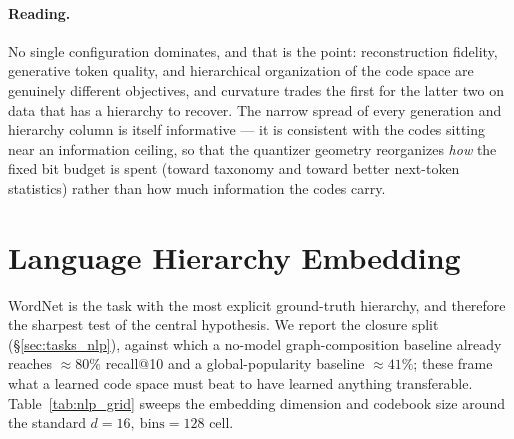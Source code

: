 \documentclass[12pt]{report}
\begin{document}
\paragraph{Reading.} No single configuration dominates, and that is the point: reconstruction fidelity, generative token quality, and hierarchical organization of the code space are genuinely different objectives, and curvature trades the first for the latter two on data that has a hierarchy to recover. The narrow spread of every generation and hierarchy column is itself informative --- it is consistent with the codes sitting near an information ceiling, so that the quantizer geometry reorganizes \emph{how} the fixed bit budget is spent (toward taxonomy and toward better next-token statistics) rather than how much information the codes carry.

\section{Language Hierarchy Embedding}
\label{sec:exp_nlp}

WordNet is the task with the most explicit ground-truth hierarchy, and therefore the sharpest test of the central hypothesis. We report the closure split (\S\ref{sec:tasks_nlp}), against which a no-model graph-composition baseline already reaches $\approx 80\%$ recall@10 and a global-popularity baseline $\approx 41\%$; these frame what a learned code space must beat to have learned anything transferable. Table~\ref{tab:nlp_grid} sweeps the embedding dimension and codebook size around the standard $d{=}16,\ \text{bins}{=}128$ cell.

\begin{table}[h]
\centering
\caption{WordNet hierarchy, Recall@10 (\%) on the closure split, single seed. Capacity grid over embedding dimension and codebook size; the $d16/b128$ column is the standard configuration. Best per column in bold. A4 here is the shallow-depth (no-gc) configuration of \S\ref{sec:configs}.}
\label{tab:nlp_grid}
\end{table}
\end{document}
